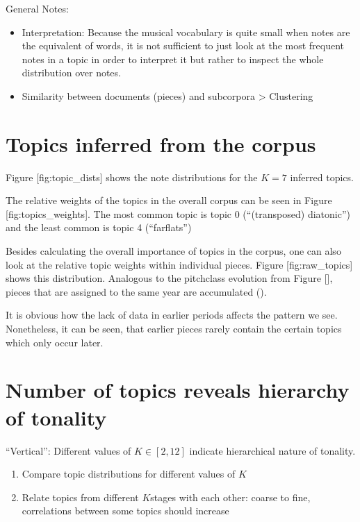 \documentclass[letterpaper,10pt,english]{sphinxmanual}
\begin{document}
\sphinxAtStartPar
General Notes:
\begin{itemize}
\item {} 
\sphinxAtStartPar
Interpretation: Because the musical vocabulary is quite small when
notes are the equivalent of words, it is not sufficient to just look
at the most frequent notes in a topic in order to interpret it but
rather to inspect the whole distribution over notes.

\item {} 
\sphinxAtStartPar
Similarity between documents (pieces) and subcorpora \textendash{}\textgreater{} Clustering

\end{itemize}


\section{Topics inferred from the corpus}
\label{\detokenize{topic_modeling:topics-inferred-from-the-corpus}}
\sphinxAtStartPar
Figure {[}fig:topic\_dists{]} shows the note distributions for the
\(K=7\) inferred topics.

\sphinxAtStartPar
The relative weights of the topics in the overall corpus can be seen in
Figure {[}fig:topics\_weights{]}. The most common topic is topic 0
(“(transposed) diatonic”) and the least common is topic 4 (“far\sphinxhyphen{}flats”)

\sphinxAtStartPar
Besides calculating the overall importance of topics in the corpus, one
can also look at the relative topic weights within individual pieces.
Figure {[}fig:raw\_topics{]} shows this distribution. Analogous to the
pitch\sphinxhyphen{}class evolution from Figure {[}{]}, pieces that are assigned to the
same year are accumulated ().

\sphinxAtStartPar
It is obvious how the lack of data in earlier periods affects the
pattern we see. Nonetheless, it can be seen, that earlier pieces rarely
contain the certain topics which only occur later.


\section{Number of topics reveals hierarchy of tonality}
\label{\detokenize{topic_modeling:number-of-topics-reveals-hierarchy-of-tonality}}
\sphinxAtStartPar
“Vertical”: Different values of \(K\in [2,12]\) indicate
hierarchical nature of tonality.
\begin{enumerate}
%
\item {} 
\sphinxAtStartPar
Compare topic distributions for different values of \(K\)

\item {} 
\sphinxAtStartPar
Relate topics from different \(K\)\sphinxhyphen{}stages with each other: coarse
to fine, correlations between some topics should increase

\end{enumerate}
\end{document}
